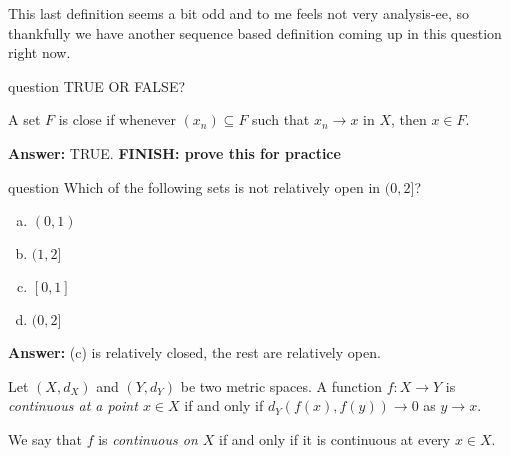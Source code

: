 \documentclass[class=article, crop=false]{standalone}
\begin{document}
This last definition seems a bit odd and to me feels not very analysis-ee, so thankfully we have another sequence based definition coming up in this question right now.

\begin{understandingcheck}{question}
  TRUE OR FALSE?

  A set $F$ is close if whenever $(x_n) \subseteq F$ such that $x_n \to x$ in $X$, then $x \in F$.

  \textbf{Answer:} TRUE. \textbf{FINISH: prove this for practice}
\end{understandingcheck}

\begin{understandingcheck}{question}
  Which of the following sets is not relatively open in $(0,2]$? \begin{enumerate}[(a)]
    \item $(0,1)$
    \item $(1,2]$
    \item $[0,1]$
    \item $(0,2]$
  \end{enumerate}

  \textbf{Answer:} (c) is relatively closed, the rest are relatively open.
\end{understandingcheck}

\begin{defn}
  Let $(X,d_X)$ and $(Y,d_Y)$ be two metric spaces. A function $f\colon X\to Y$ is \emph{continuous at a point $x \in X$} if and only if $d_Y(f(x), f(y)) \to 0$ as $y \to x$.

  We say that $f$ is \emph{continuous on $X$} if and only if it is continuous at every $x \in X$.
\end{defn}
\end{document}
